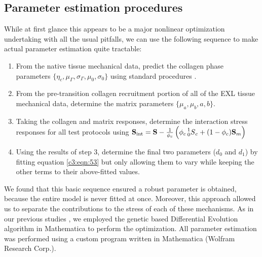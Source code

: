         
        
        
\subsection{Parameter estimation procedures}

    While at first glance this appears to be a major nonlinear optimization undertaking with all the usual pitfalls, we can use the following sequence to make actual parameter estimation quite tractable:
        \begin{enumerate}
            \item From the native tissue mechanical data, predict the collagen phase parameters $\{\eta_c, \mu_\Gamma, \sigma_\Gamma, \mu_0, \sigma_0\}$ using standard procedures \cite{fata_insights_2014}\cite{zhang_meso_2016}.
            \item From the pre-transition collagen recruitment portion of all of the EXL tissue mechanical data, determine the matrix parameters $\{\mu_a, \mu_b, a, b\}$.
            \item Taking the collagen and matrix responses, determine the interaction stress responses for all test protocols using $\mathbf{S}_\mathrm{int} = \mathbf{S} - \frac{1}{\phi_c}\left(\phi_c \prescript{1}{0}{S}_c + (1-\phi_c)\mathbf{S}_m\right)$
            \item Using the results of step 3, determine the final two parameters ($d_0$ and $d_1$) by fitting equation \ref{c3:eqn:53} but only allowing them to vary while keeping the other terms to their above-fitted values.
        \end{enumerate}
    We found that this basic sequence ensured a robust parameter is obtained, because the entire model is never fitted at once. Moreover, this approach allowed us to separate the contributions to the stress of each of these mechanisms. As in our previous studies \cite{fata_insights_2014}\cite{zhang_meso_2016}, we employed the genetic based Differential Evolution algorithm in Mathematica to perform the optimization. All parameter estimation was performed using a custom program written in Mathematica (Wolfram Research Corp.).

        
        